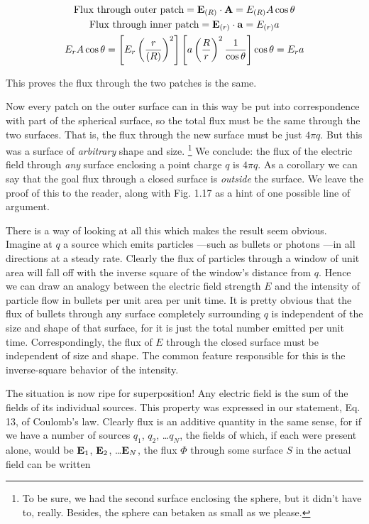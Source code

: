 \begin{gather*}
\text{Flux through outer patch} =  \mathbf{E}_{(R)} \cdot \mathbf{A} =   E_ {(R)}  A\cos\theta \\
\text{Flux through inner patch} =  \mathbf{E}_ {(r)} \cdot \mathbf{a} =   E_ {(r)}  a \\
E_r A\cos\theta =  \left[E_r \left(\frac{r}{(R)} \right)^2  \right]
                   \left[a\left(\frac{R}{r} \right)^2  \frac{1}{\cos\theta}\right]
                   \cos\theta =  E_r a
\end{gather*}

\noindent This proves the flux through the two patches is the same.

Now every patch on the outer surface can in this way be put into
correspondence with part of the spherical surface, so the total flux
must be the same through the two surfaces. That is, the flux through
the new surface must be just $4 \pi q$. But this was a surface of
\emph{arbitrary} shape and size. \footnote{To be sure, we had the
second surface enclosing the sphere, but it didn't have to, really.
Besides, the sphere can betaken as small as we please.} We conclude:
the flux of the electric field through \emph{any} surface enclosing a
point charge $q$ is $4 \pi q$. As a corollary we can say that the
goal flux through a closed surface is \emph{outside} the surface. We
leave the proof of this to the reader, along with Fig. 1.17 as a
hint of one possible line of argument.

There is a way of looking at all this which makes the result seem
obvious. Imagine at $q$ a source which emits particles ---such as
bullets or photons ---in all directions at a steady rate. Clearly the
flux of particles through a window of unit area will fall off with
the inverse square of the window's distance from $q$. Hence we can
draw an analogy between the electric field strength $E$ and the
intensity of particle flow in bullets per unit area per unit time. It
is pretty obvious that the flux of bullets through any surface
completely surrounding $q$ is independent of the size and shape of
that surface, for it is just the total number emitted per unit time.
Correspondingly, the flux of $E$ through the closed surface must be
independent of size 
and shape. The common feature
responsible for this is the inverse-square behavior of the intensity.

The situation is now ripe for superposition! Any electric field is
the sum of the fields of its individual sources. This property was
expressed in our statement, Eq. 13, of Coulomb's law. Clearly flux
is an additive quantity in the same sense, for if we have a number of
sources $q_1$, $q_2$, \ldots $q_N$, the fields of which, if each were
present alone, would be $\mathbf{E}_1$, $\mathbf{E}_2$, \ldots $\mathbf{E}_N$, the
flux $\Phi$ through some surface $S$ in the actual field can be written


